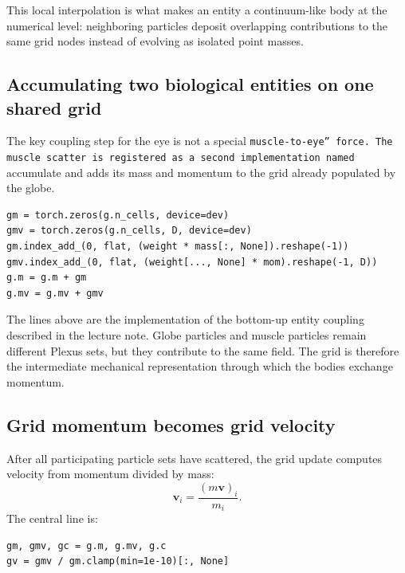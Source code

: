 \documentclass[11pt]{article}
\begin{document}
This local interpolation is what makes an entity a continuum-like body at the numerical level: neighboring particles deposit overlapping contributions to the same grid nodes instead of evolving as isolated point masses.

\subsection{Accumulating two biological entities on one shared grid}

The key coupling step for the eye is not a special \texttt{muscle-to-eye'' force. The muscle scatter is registered as a second implementation named }accumulate and adds its mass and momentum to the grid already populated by the globe.

\begin{lstlisting}[caption={\texttt{prototype/eye/muscle\_ops.py}: multi-body particle-to-grid accumulation on the shared MPM field.},label={lst:accumulate-code}]
gm = torch.zeros(g.n_cells, device=dev)
gmv = torch.zeros(g.n_cells, D, device=dev)
gm.index_add_(0, flat, (weight * mass[:, None]).reshape(-1))
gmv.index_add_(0, flat, (weight[..., None] * mom).reshape(-1, D))
g.m = g.m + gm
g.mv = g.mv + gmv
\end{lstlisting}

The lines above are the implementation of the bottom-up entity coupling described in the lecture note. Globe particles and muscle particles remain different Plexus sets, but they contribute to the same field. The grid is therefore the intermediate mechanical representation through which the bodies exchange momentum.

\subsection{Grid momentum becomes grid velocity}

After all participating particle sets have scattered, the grid update computes velocity from momentum divided by mass:
\begin{equation}
\mathbf v_i=\frac{(m\mathbf v)_i}{m_i}.
\label{eq:auto33}
\end{equation}
The central line is:

\begin{lstlisting}[caption={\texttt{src/plexus/operators/mpm\_grid\_update.py}: grid momentum-to-velocity step.},label={lst:grid-velocity-code}]
gm, gmv, gc = g.m, g.mv, g.c
gv = gmv / gm.clamp(min=1e-10)[:, None]
\end{lstlisting}
\end{document}
